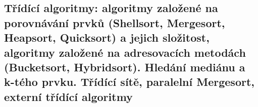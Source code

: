 \subsection{Třídící algoritmy: algoritmy založené na porovnávání prvků (Shellsort, Mergesort, Heapsort, Quicksort) a jejich složitost, algoritmy založené na adresovacích metodách (Bucketsort, Hybridsort). Hledání mediánu a k-tého prvku. Třídící sítě, paralelní Mergesort, externí třídící algoritmy}